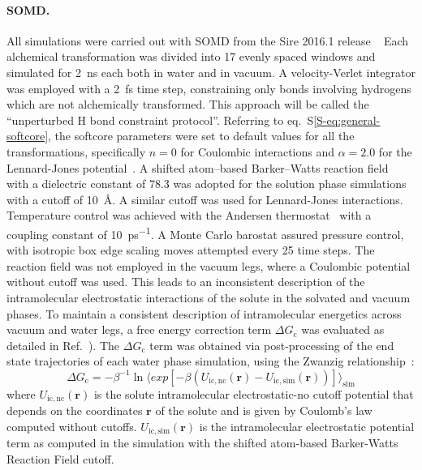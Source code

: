 \documentclass[journal=jctcce,manuscript=article]{achemso}
\begin{document}
\paragraph{SOMD.} All simulations were carried out with
SOMD from the Sire 2016.1 release ~\cite{Sire-2016, doi:10.1021/ct300857j}
Each alchemical transformation was
divided into 17 evenly spaced windows and simulated for \SI{2}{ns}
each both in water and in vacuum. A velocity-Verlet integrator was
employed with a \SI{2}{fs} time step, constraining only bonds involving hydrogens which are not alchemically transformed.  This approach will be called the ``unperturbed H bond constraint protocol''. Referring to eq.~S\ref{S-eq:general-softcore}, the softcore parameters were set to default values for all the transformations, specifically $n = 0$ for Coulombic interactions and $\alpha = 2.0$ for the Lennard-Jones potential~\cite{doi:10.1021/ct700081t}.  A shifted atom--based Barker--Watts reaction field~\cite{doi:10.1080/00268977300102101} with
a dielectric constant of \num{78.3} was adopted for the solution phase
simulations with a cutoff of \SI{10}{\angstrom}. A similar cutoff was used for 
Lennard-Jones interactions. Temperature control was achieved with the Andersen
thermostat~\cite{doi:10.1063/1.439486} with a coupling constant of
\SI{10}{ps^{-1}}.  A Monte Carlo barostat assured pressure control,
with isotropic box edge scaling moves attempted every 25 time steps.
The reaction field was not employed in the vacuum legs, where a Coulombic 
potential without cutoff was used.  This leads to an inconsistent description of the intramolecular electrostatic interactions of the solute in the solvated and vacuum phases.   To maintain a consistent description of intramolecular 
energetics across vacuum and water legs, a free energy correction term $\Delta G_{\mathrm{c}}$ was  evaluated as detailed in Ref.~).  The
$\Delta G_{\mathrm{c}}$ term was obtained via post-processing of the end state 
trajectories of each water phase simulation, using the Zwanzig 
relationship~\cite{zwanzig_high-temperature_1954}:
\begin{equation}
 \label{eq:ZwanzigDGfunc}
 \Delta G_{\mathrm{c}} = -\beta^{-1} \ln \langle exp 
 \left[-\beta(U_{\mathrm{ic,nc}}(\mathbf{r}) - 
 U_{\mathrm{ic,sim}}(\mathbf{r}))\right]\rangle_{\mathrm{sim}}
\end{equation}
where $U_{\mathrm{ic,nc}}(\mathbf{r})$ is the solute intramolecular 
electrostatic-no cutoff 
potential that depends on the coordinates $\mathbf{r}$ of the solute and is 
given by Coulomb's law computed without cutoffs. 
$U_{\mathrm{ic,sim}}(\mathbf{r})$ is the intramolecular electrostatic potential 
term as
computed in the simulation with the shifted atom-based Barker-Watts Reaction 
Field cutoff.
\end{document}
